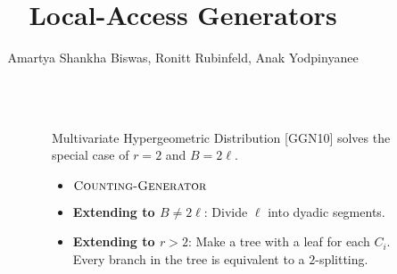 \documentclass[final]{beamer}
\title{Local-Access Generators} %
\author{Amartya Shankha Biswas, Ronitt Rubinfeld, Anak Yodpinyanee} %
\institute{CSAIL, MIT} %
\newlength{\sepwid}
\newlength{\leftcolwid}
\newlength{\rightcolwid}
\newlength{\twocolwid}
\begin{document}

\setlength{\belowcaptionskip}{2ex} %
\setlength\belowdisplayshortskip{2ex} %

\begin{frame}[t] %


\begin{columns}[t] %

\begin{column}{\sepwid}\end{column} %

\begin{column}{\leftcolwid} %




\end{column} %


\begin{column}{\sepwid}\end{column} %


\begin{column}{\twocolwid} %






\end{column} %



\begin{column}{\sepwid}\end{column} %



\begin{column}{\rightcolwid} %

\begin{alertblock}{Multivariate Hypergeometric Distribution}
[GGN10] solves the special case of $r=2$ and $B = 2\ell$.
\begin{itemize}
    \item [] $\textsc{Counting-Generator}$
    \item \textbf{Extending to $B\not= 2\ell$}: Divide $\ell$ into dyadic segments.
    \item \textbf{Extending to $r>2$}: Make a tree with a leaf for each $C_i$.
          Every branch in the tree is equivalent to a $2$-splitting.
\end{itemize}
\end{alertblock}


\end{column}
\end{columns}
\end{frame}
\end{document}
